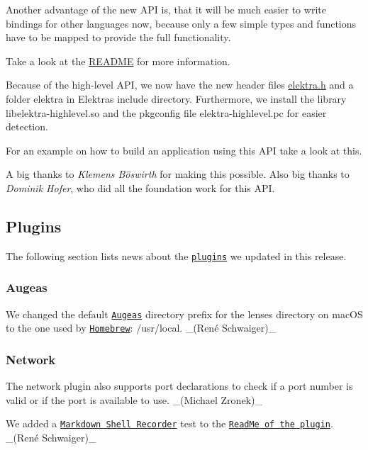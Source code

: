 Another advantage of the new A\+PI is, that it will be much easier to write bindings for other languages now, because only a few simple types and functions have to be mapped to provide the full functionality.

Take a look at the \hyperlink{src_libs_highlevel_README_md}{R\+E\+A\+D\+ME} for more information.

Because of the high-\/level A\+PI, we now have the new header files {\ttfamily \hyperlink{elektra_8h}{elektra.\+h}} and a folder {\ttfamily elektra} in Elektra\textquotesingle{}s include directory. Furthermore, we install the library {\ttfamily libelektra-\/highlevel.\+so} and the pkgconfig file {\ttfamily elektra-\/highlevel.\+pc} for easier detection.

For an example on how to build an application using this A\+PI take a look at this.

A big thanks to {\itshape Klemens Böswirth} for making this possible. Also big thanks to {\itshape Dominik Hofer}, who did all the foundation work for this A\+PI.

\subsection*{Plugins}

The following section lists news about the \href{https://www.libelektra.org/plugins/readme}{\tt plugins} we updated in this release.

\subsubsection*{Augeas}


\begin{DoxyItemize}
\item We changed the default \href{http://augeas.net}{\tt Augeas} directory prefix for the lenses directory on mac\+OS to the one used by \href{https://brew.sh}{\tt Homebrew}\+: {\ttfamily /usr/local}. \+\_\+(René Schwaiger)\+\_\+
\end{DoxyItemize}

\subsubsection*{Network}


\begin{DoxyItemize}
\item The {\ttfamily network} plugin also supports port declarations to check if a port number is valid or if the port is available to use. \+\_\+(\+Michael Zronek)\+\_\+
\item We added a \href{https://master.libelektra.org/tests/shell/shell_recorder/tutorial_wrapper}{\tt Markdown Shell Recorder} test to the \href{https://www.libelektra.org/plugins/network}{\tt Read\+Me of the plugin}. \+\_\+(René Schwaiger)\+\_\+
\end{DoxyItemize}

